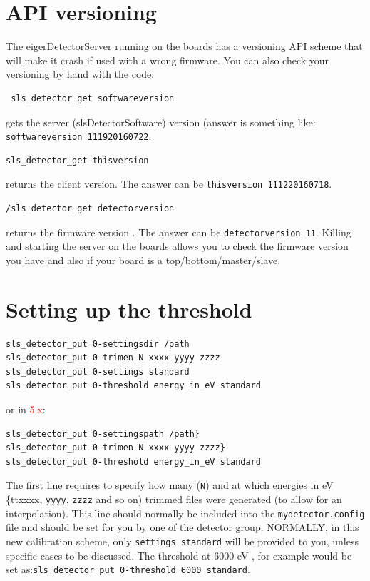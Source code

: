 \documentclass{article}
\begin{document}
\section{API versioning} \label{api}
The eigerDetectorServer running on the boards has a versioning API scheme that will make it crash if used with a wrong firmware.
You can also check your versioning by hand with the code:
\begin{verbatim}
 sls_detector_get softwareversion
\end{verbatim}
gets the server (slsDetectorSoftware) version (answer is something like: {\tt{softwareversion 111920160722}}.
 \begin{verbatim}
sls_detector_get thisversion 
\end{verbatim}
returns the client version. The answer can be {\tt{thisversion 111220160718}}.
\begin{verbatim}
/sls_detector_get detectorversion
\end{verbatim}
returns the firmware version . The answer can be {\tt{detectorversion 11}}.
Killing and starting the server on the boards allows you to check the firmware version you have and also if your board is a top/bottom/master/slave.

\section{Setting up the threshold}
\begin{verbatim}
sls_detector_put 0-settingsdir /path
sls_detector_put 0-trimen N xxxx yyyy zzzz
sls_detector_put 0-settings standard 
sls_detector_put 0-threshold energy_in_eV standard
\end{verbatim}
or in \textcolor{red}{5.x}:
\begin{verbatim}
sls_detector_put 0-settingspath /path}
sls_detector_put 0-trimen N xxxx yyyy zzzz}
sls_detector_put 0-threshold energy_in_eV standard
\end{verbatim}

The first line requires to specify how many ({\tt{N}}) and at which energies in eV {\{tt{xxxx}}, {\tt{yyyy}}, {\tt{zzzz}} and so on) trimmed files were generated (to allow for an interpolation). This line should normally be included into the {\tt{mydetector.config}} file and should be set for you by one of the detector group.
NORMALLY, in this new calibration scheme, only {\tt{settings standard}} will be provided to you, unless specific cases to be discussed.
The threshold at 6000 eV , for example would be set as:{\tt{sls\_detector\_put 0-threshold 6000 standard}}.
\end{document}
